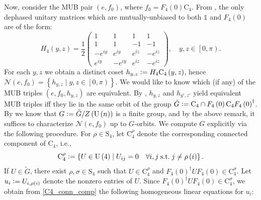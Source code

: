 \documentclass[referee,sn-mathphys-num]{sn-jnl}%
\theoremstyle{thmstyleone}%
\theoremstyle{thmstyletwo}%
\theoremstyle{remark}
\theoremstyle{thmstylethree}%
\newcommand{\defeq}{\vcentcolon=}
\begin{document}
	Now, consider the MUB pair $ \left( e, f_0 \right) $, where $ f_0 = F_4 \left( 0 \right) \mathrm{C}_4 $. From \cite{brierley2009all}, the only dephased unitary matrices which are mutually-unbiased to both $ \mathds{1} $ and $ F_4 \left( 0 \right) $ are of the form:
	\begin{equation}\label{H4_yz}
		H_4 \left( y, z \right) = \frac{1}{2} \begin{pmatrix}
			1 & 1 & 1 & 1 \\
			1 & 1 & -1 & -1 \\
			-e^{i y} & e^{i y} & e^{i z} & -e^{i z} \\
			e^{i y} & -e^{i y} & e^{i z} & -e^{i z}
		\end{pmatrix} , \quad y, z \in \left[ 0, \pi \right) .
	\end{equation}
	For each $y, z$ we obtain a distinct coset $ h_{y,z} \defeq H_4 \mathrm{C}_4 \left( y, z \right) $, hence $ \mathcal{N} \left( e, f_0 \right) = \left\{ h_{y,z} \mid y, z \in \left[ 0, \pi \right) \right\} $. We would like to know which (if any) of the MUB triples $ \left( e, f_0, h_{y,z} \right) $ are equivalent. By , $ h_{y, z} $ and $ h_{y', z'} $ yield equivalent MUB triples iff they lie in the same orbit of the group $ \tilde{G} \defeq \mathrm{C}_4 \cap F_4 \left( 0 \right) \mathrm{C}_4 F_4 \left( 0 \right)^\dagger $. 
	By  we know that $ G \defeq \tilde{G} / Z \left( \mathrm{U} \left( n \right) \right) $ is a finite group, and by the above remark, it suffices to characterize $ \mathcal{N} \left( e, f_0 \right) $ up to $G$-orbits. We compute $G$ explicitly via the following procedure. For $ \rho \in \mathrm{S}_4 $, let $ \mathrm{C}_4^\rho $ denote the corresponding connected component of $ \mathrm{C}_4 $, i.e.,
\begin{equation}\label{C4_conn_comp}
		\mathrm{C}_4^\rho \defeq \left\{ U \in \mathrm{U} \left( 4 \right) \mid U_{ij} = 0 \quad \forall i, j \; \mathrm{s.t.} \; j \neq \rho \left( i \right) \right\} .
\end{equation}
If $ U \in \tilde{G} $, there exist $ \rho, \sigma \in \mathrm{S}_4 $ such that $ U \in \mathrm{C}_4^\rho $ and $ F_4 \left( 0 \right)^\dagger U F_4 \left( 0 \right) \in \mathrm{C}_4^\sigma $. Let $ u_i \defeq U_{i, \rho \left( i \right)} $ denote the nonzero entries of $U$. Since $ F_4 \left( 0 \right)^\dagger U F_4 \left( 0 \right) \in \mathrm{C}_4^\sigma $, we obtain from \eqref{C4_conn_comp} the following homogeneous linear equations for $ u_i $:
\end{document}
